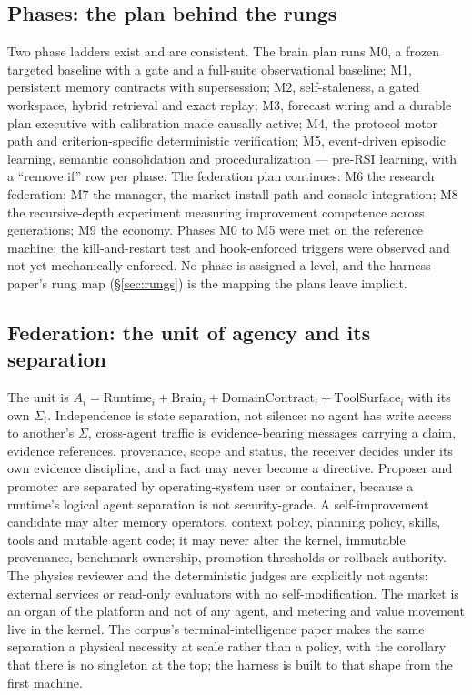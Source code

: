 \subsection{Phases: the plan behind the rungs}

Two phase ladders exist and are consistent. The brain plan runs M0, a frozen targeted baseline with a gate and a full-suite observational baseline; M1, persistent memory contracts with supersession; M2, self-staleness, a gated workspace, hybrid retrieval and exact replay; M3, forecast wiring and a durable plan executive with calibration made causally active; M4, the protocol motor path and criterion-specific deterministic verification; M5, event-driven episodic learning, semantic consolidation and proceduralization --- pre-RSI learning, with a ``remove if'' row per phase. The federation plan continues: M6 the research federation; M7 the manager, the market install path and console integration; M8 the recursive-depth experiment measuring improvement competence across generations; M9 the economy. Phases M0 to M5 were met on the reference machine; the kill-and-restart test and hook-enforced triggers were observed and not yet mechanically enforced. No phase is assigned a level, and the harness paper's rung map (\S\ref{sec:rungs}) is the mapping the plans leave implicit.

\subsection{Federation: the unit of agency and its separation}

The unit is $A_i = \text{Runtime}_i + \text{Brain}_i + \text{DomainContract}_i + \text{ToolSurface}_i$ with its own $\Sigma_i$. Independence is state separation, not silence: no agent has write access to another's $\Sigma$, cross-agent traffic is evidence-bearing messages carrying a claim, evidence references, provenance, scope and status, the receiver decides under its own evidence discipline, and a fact may never become a directive. Proposer and promoter are separated by operating-system user or container, because a runtime's logical agent separation is not security-grade. A self-improvement candidate may alter memory operators, context policy, planning policy, skills, tools and mutable agent code; it may never alter the kernel, immutable provenance, benchmark ownership, promotion thresholds or rollback authority. The physics reviewer and the deterministic judges are explicitly not agents: external services or read-only evaluators with no self-modification. The market is an organ of the platform and not of any agent, and metering and value movement live in the kernel. The corpus's terminal-intelligence paper makes the same separation a physical necessity at scale rather than a policy, with the corollary that there is no singleton at the top; the harness is built to that shape from the first machine.

